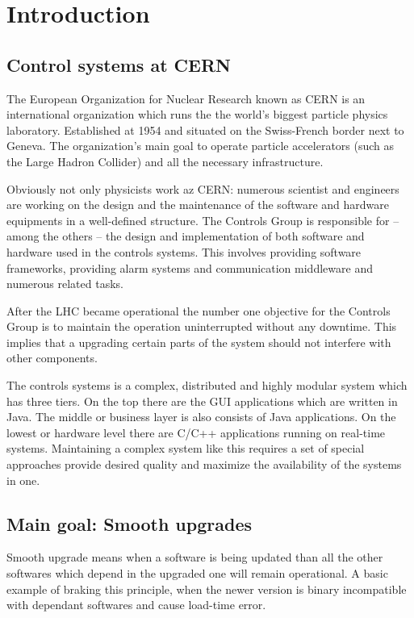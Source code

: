\chapter{Introduction}


\section{Control systems at CERN}

The European Organization for Nuclear Research known as CERN is an international
organization which runs the the world's biggest particle physics laboratory.
Established at 1954 and situated on the Swiss-French border next to Geneva. The
organization's main goal to operate particle accelerators (such as the Large
Hadron Collider) and all the necessary infrastructure.

Obviously not only physicists work az CERN: numerous scientist and engineers are
working on the design and the maintenance of the software and hardware
equipments in a well-defined structure. The Controls Group is responsible for --
among the others -- the design and implementation of both software and hardware
used in the controls systems. This involves providing software frameworks,
providing alarm systems and communication middleware and numerous related tasks.

After the LHC became operational the number one objective for the Controls Group
is to maintain the operation uninterrupted without any downtime. This implies
that a upgrading certain parts of the system should not interfere with other
components.

The controls systems is a complex, distributed and highly modular system which
has three tiers. On the top there are the GUI applications which are written in
Java. The middle or business layer is also consists of Java applications. On the
lowest or hardware level there are C/C++ applications running on real-time
systems. Maintaining a complex system like this requires a set of special
approaches provide desired quality and maximize the availability of the systems
in one.

\section{Main goal: Smooth upgrades}
Smooth upgrade means when a software is being updated than all the other
softwares which depend in the upgraded one will remain operational. A basic
example of braking this principle, when the newer version is binary
incompatible with dependant softwares and cause load-time error.


